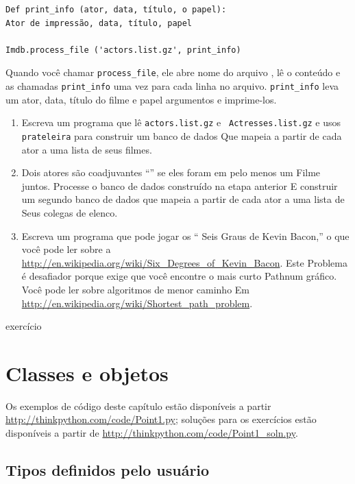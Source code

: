 \documentclass[10pt]{book}
\begin{document}
\begin{v erbatim}
\begin{}
\begin{verbatim}
Def print_info (ator, data, título, o papel):
Ator de impressão, data, título, papel

Imdb.process_file ('actors.list.gz', print_info)
\end{verbatim}

Quando você chamar \verb "process_file", ele abre {nome do arquivo \tt}, lê o
conteúdo e as chamadas \verb "print_info" uma vez para cada linha no arquivo.
\Verb "print_info" leva um ator, data, título do filme e papel
argumentos e imprime-los.

\begin{enumerate}

\item Escreva um programa que lê {\tt actors.list.gz} e {\tt
Actresses.list.gz} e usos {\tt prateleira} para construir um banco de dados
Que mapeia a partir de cada ator a uma lista de seus filmes.

\item Dois atores são coadjuvantes ``'' se eles foram em pelo menos um
Filme juntos. Processe o banco de dados construído na etapa anterior
E construir um segundo banco de dados que mapeia a partir de cada ator a uma lista de
Seus colegas de elenco.

\item Escreva um programa que pode jogar os `` Seis Graus de Kevin
Bacon,'' o que você pode ler sobre a
\url{http://en.wikipedia.org/wiki/Six_Degrees_of_Kevin_Bacon}. Este
Problema é desafiador porque exige que você encontre o mais curto
Pathnum gráfico. Você pode ler sobre algoritmos de menor caminho
Em \url{http://en.wikipedia.org/wiki/Shortest_path_problem}.

\end{enumerate}

\end{} exercício


\chapter{Classes e objetos}

Os exemplos de código deste capítulo estão disponíveis a partir
\url{http://thinkpython.com/code/Point1.py}; soluções
para os exercícios estão disponíveis a partir de
\url{http://thinkpython.com/code/Point1_soln.py}.


\section{Tipos definidos pelo usuário}
\label{ponto}


\end{v erbatim}
\end{document}
